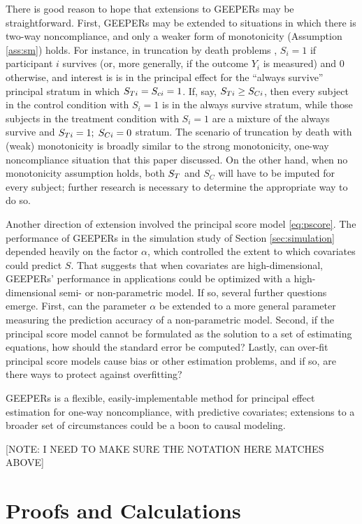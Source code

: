 \documentclass[11pt]{article} %
\begin{document}
There is good reason to hope that extensions to GEEPERs may be straightforward.
First, GEEPERs may be extended to situations in which there is two-way noncompliance, and only a weaker form of monotonicity (Assumption \ref{ass:sm}) holds.
For instance, in truncation by death problems \citep[e.g.][]{zhangRubin,ding2011}, $S_i=1$ if participant $i$ survives (or, more generally, if the outcome $Y_i$ is measured) and 0 otherwise, and interest is is in the principal effect for the ``always survive'' principal stratum in which $S_{Ti}=S_{ci}=1$.
If, say, $S_{Ti}\ge S_{Ci}$, then every subject in the control condition with $S_i=1$ is in the always survive stratum, while those subjects in the treatment condition with $S_i=1$ are a mixture of the always survive and $S_{Ti}=1;\;S_{Ci}=0$ stratum.
The scenario of truncation by death with (weak) monotonicity is broadly similar to the strong monotonicity, one-way noncompliance situation that this paper discussed.
On the other hand, when no monotonicity assumption holds, both $S_T$ and $S_C$ will have to be imputed for every subject; further research is necessary to determine the appropriate way to do so.

Another direction of extension involved the principal score model \eqref{eq:pscore}.
The performance of GEEPERs in the simulation study of Section \ref{sec:simulation} depended heavily on the factor $\alpha$, which controlled the extent to which covariates could predict $S$.
That suggests that when covariates are high-dimensional, GEEPERs' performance in applications could be optimized with a high-dimensional semi- or non-parametric model.
If so, several further questions emerge.
First, can the parameter $\alpha$ be extended to a more general parameter measuring the prediction accuracy of a non-parametric model.
Second, if the principal score model cannot be formulated as the solution to a set of estimating equations, how should the standard error be computed?
Lastly, can over-fit principal score models cause bias or other estimation problems, and if so, are there ways to protect against overfitting?

GEEPERs is a flexible, easily-implementable method for principal effect estimation for one-way noncompliance, with predictive covariates; extensions to a broader set of circumstances could be a boon to causal modeling.



\appendix

[NOTE: I NEED TO MAKE SURE THE NOTATION HERE MATCHES ABOVE]
\section{Proofs and Calculations}
\end{document}
